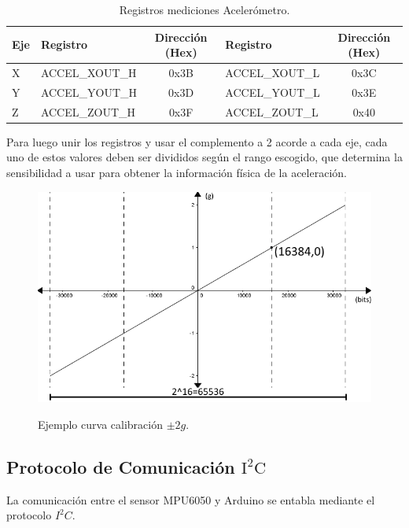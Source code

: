 \documentclass[12pt,a4paper]{article}
\begin{document}
\begin{itemize}
	\begin{table}[H]
		\centering
		\caption{Registros mediciones Acelerómetro.}
		\label{table:registrosaccel}
		\begin{tabular}{|l|l|c|l|c|}
			\hline
			\textbf{Eje} & \textbf{Registro} & \textbf{Dirección (Hex)} & \textbf{Registro} & \textbf{Dirección (Hex)} \\ \hline
			X            & ACCEL\_XOUT\_H     & 0x3B                     & ACCEL\_XOUT\_L     & 0x3C                     \\ \hline
			Y            & ACCEL\_YOUT\_H     & 0x3D                     & ACCEL\_YOUT\_L     & 0x3E                     \\ \hline
			Z            & ACCEL\_ZOUT\_H     & 0x3F                     & ACCEL\_ZOUT\_L     & 0x40                     \\ \hline
		\end{tabular}				
	\end{table}				
	
	Para luego unir los registros y usar el complemento a 2 acorde a cada eje, cada uno de estos valores deben ser divididos según el rango escogido, que determina la sensibilidad a usar para obtener la información física de la aceleración.
	
	\begin{figure}[H]
		\centering
		\includegraphics[scale=0.6]{images/curvacalibracion}
		\label{fig:curvacalibracion}
		\caption{Ejemplo curva calibración $\pm 2g$.}
	\end{figure}
	
\end{itemize}



\subsection{Protocolo de Comunicación $\mathbf{\mathrm{I^2C}}$}
La comunicación entre el sensor MPU6050 y Arduino se entabla mediante el protocolo $I^2C$.
\end{document}
